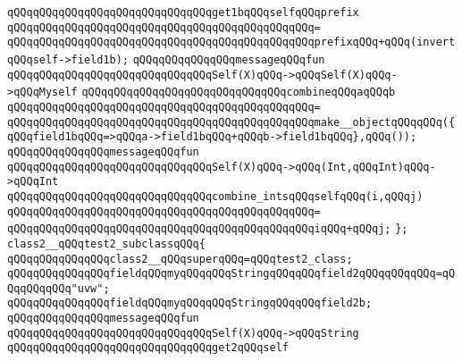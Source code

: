 \verb|qQQqqQQqqQQqqQQqqQQqqQQqqQQqqQQqget1bqQQqselfqQQqprefix|\newline
\verb|qQQqqQQqqQQqqQQqqQQqqQQqqQQqqQQqqQQqqQQqqQQqqQQq=|\newline
\verb|qQQqqQQqqQQqqQQqqQQqqQQqqQQqqQQqqQQqqQQqqQQqqQQqprefixqQQq+qQQq(invertqQQqself->field1b);|\newline
\newline
\verb|qQQqqQQqqQQqqQQqmessageqQQqfun|\newline
\verb|qQQqqQQqqQQqqQQqqQQqqQQqqQQqqQQqSelf(X)qQQq->qQQqSelf(X)qQQq->qQQqMyself|\newline
\verb|qQQqqQQqqQQqqQQqqQQqqQQqqQQqqQQqcombineqQQqaqQQqb|\newline
\verb|qQQqqQQqqQQqqQQqqQQqqQQqqQQqqQQqqQQqqQQqqQQqqQQq=|\newline
\verb|qQQqqQQqqQQqqQQqqQQqqQQqqQQqqQQqqQQqqQQqqQQqqQQqmake__objectqQQqqQQq({qQQqfield1bqQQq=>qQQqa->field1bqQQq+qQQqb->field1bqQQq},qQQq());|\newline
\newline
\verb|qQQqqQQqqQQqqQQqmessageqQQqfun|\newline
\verb|qQQqqQQqqQQqqQQqqQQqqQQqqQQqqQQqSelf(X)qQQq->qQQq(Int,qQQqInt)qQQq->qQQqInt|\newline
\verb|qQQqqQQqqQQqqQQqqQQqqQQqqQQqqQQqcombine_intsqQQqselfqQQq(i,qQQqj)|\newline
\verb|qQQqqQQqqQQqqQQqqQQqqQQqqQQqqQQqqQQqqQQqqQQqqQQq=|\newline
\verb|qQQqqQQqqQQqqQQqqQQqqQQqqQQqqQQqqQQqqQQqqQQqqQQqiqQQq+qQQqj;|\newline
\verb|};|\newline
\newline
\verb|class2__qQQqtest2_subclassqQQq{|\newline
\newline
\verb|qQQqqQQqqQQqqQQqclass2__qQQqsuperqQQq=qQQqtest2_class;|\newline
\newline
\verb|qQQqqQQqqQQqqQQqfieldqQQqmyqQQqqQQqStringqQQqqQQqfield2qQQqqQQqqQQq=qQQqqQQqqQQq"uvw";|\newline
\verb|qQQqqQQqqQQqqQQqfieldqQQqmyqQQqqQQqStringqQQqqQQqfield2b;|\newline
\newline
\verb|qQQqqQQqqQQqqQQqmessageqQQqfun|\newline
\verb|qQQqqQQqqQQqqQQqqQQqqQQqqQQqqQQqSelf(X)qQQq->qQQqString|\newline
\verb|qQQqqQQqqQQqqQQqqQQqqQQqqQQqqQQqget2qQQqself|\newline
